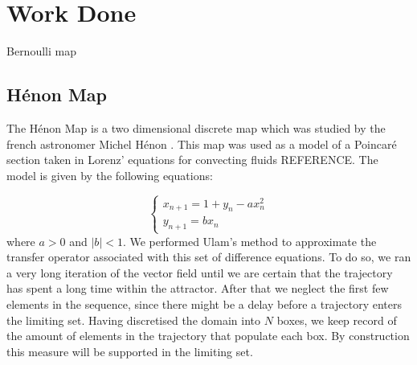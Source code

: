 \section*{Work  Done}

Bernoulli map

\subsection*{H\'{e}non Map}

The H\'{e}non Map is a two dimensional discrete map which was studied by the french astronomer Michel H\'{e}non \cite{henon}. This map was used as a model of a Poincar\'{e} section taken in Lorenz' equations for convecting fluids REFERENCE. The model is given by the following equations:

\begin{equation}
\begin{cases}
x_{n+1}=1+y_n - ax_n ^2 \\
y_{n+1}=bx_n
\end{cases}
\end{equation}
where $a>0$ and $\vert b \vert <1 $. We performed Ulam's method to approximate the transfer operator associated with this set of difference equations. To do so, we ran a very long iteration of the vector field until we are certain that the trajectory has spent a long time within the attractor. After that we neglect the first few elements in the sequence, since there might be a delay before a trajectory enters the limiting set. Having discretised the domain into $N$ boxes, we keep record of the amount of elements in the trajectory that populate each box. By construction this measure will be supported in the limiting set.

